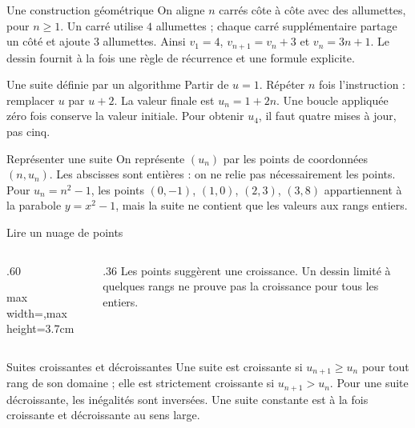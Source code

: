 \documentclass[aspectratio=169,12pt]{beamer}
\begin{document}
\renewcommand{\slidekind}{COMPRENDRE}
\begin{frame}[t,fragile]{Une construction géométrique}
On aligne $n$ carrés côte à côte avec des allumettes, pour $n\ge1$. Un carré utilise $4$ allumettes ; chaque carré supplémentaire partage un côté et ajoute $3$ allumettes. Ainsi $v_1=4$, $v_{n+1}=v_n+3$ et $v_n=3n+1$. Le dessin fournit à la fois une règle de récurrence et une formule explicite.
\end{frame}
\renewcommand{\slidekind}{COMPRENDRE}
\begin{frame}[t,fragile]{Une suite définie par un algorithme}
Partir de $u=1$. Répéter $n$ fois l’instruction : remplacer $u$ par $u+2$. La valeur finale est $u_n=1+2n$. Une boucle appliquée zéro fois conserve la valeur initiale. Pour obtenir $u_4$, il faut quatre mises à jour, pas cinq.
\end{frame}
\renewcommand{\slidekind}{COMPRENDRE}
\begin{frame}[t,fragile]{Représenter une suite}
On représente $(u_n)$ par les points de coordonnées $(n,u_n)$. Les abscisses sont entières : on ne relie pas nécessairement les points. Pour $u_n=n^2-1$, les points $(0,-1)$, $(1,0)$, $(2,3)$, $(3,8)$ appartiennent à la parabole $y=x^2-1$, mais la suite ne contient que les valeurs aux rangs entiers.
\end{frame}
\renewcommand{\slidekind}{COMPRENDRE}
\begin{frame}[t,fragile]{Lire un nuage de points}
\begin{columns}[c,onlytextwidth]\begin{column}{.60\textwidth}\centering\begin{adjustbox}{max width=\linewidth,max height=3.7cm}\end{adjustbox}\end{column}\begin{column}{.36\textwidth} Les points suggèrent une croissance. Un dessin limité à quelques rangs ne prouve pas la croissance pour tous les entiers.\end{column}\end{columns}
\end{frame}
\renewcommand{\slidekind}{COMPRENDRE}
\begin{frame}[t,fragile]{Suites croissantes et décroissantes}
Une suite est croissante si $u_{n+1}\ge u_n$ pour tout rang de son domaine ; elle est strictement croissante si $u_{n+1}>u_n$. Pour une suite décroissante, les inégalités sont inversées. Une suite constante est à la fois croissante et décroissante au sens large.
\end{frame}
\end{document}
